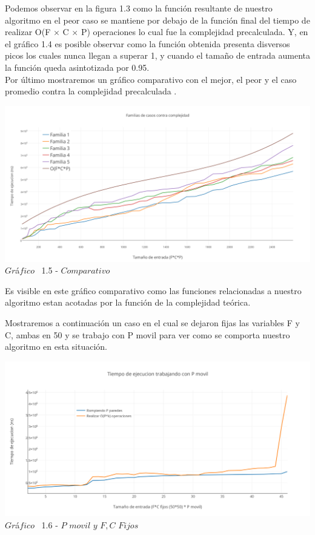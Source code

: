 Podemos observar en la figura 1.3 como la funci\'on resultante de nuestro algoritmo en el peor caso se mantiene por debajo de la funci\'on final del tiempo de realizar O(F $\times$ C $\times$ P) operaciones lo cual fue la complejidad precalculada. Y, en el gr\'afico 1.4 es posible observar como la funci\'on obtenida presenta disversos picos los cuales nunca llegan a superar 1, y cuando el tamaño de entrada aumenta la funci\'on queda asintotizada por 0.95.\\

Por \'ultimo mostraremos un gr\'afico comparativo con el mejor, el peor y el caso promedio contra la complejidad precalculada .\\

  
  \vspace*{0.3cm} \vspace*{0.3cm}
  \begin{center}
\includegraphics[scale=0.4]{./EJ1/comparativo1.png}
{$Gr$\'a$fico$ \ 1.5 - $Comparativo$}
  \end{center}
  \vspace*{0.3cm}
  
 Es visible en este gr\'afico comparativo como las funciones relacionadas a nuestro algoritmo estan acotadas por la funci\'on de la complejidad te\'orica.

Mostraremos a continuaci\'on un caso en el cual se dejaron fijas las variables F y C, ambas en 50 y se trabajo con P movil para ver como se comporta nuestro algoritmo en esta situaci\'on.

\vspace*{0.3cm} \vspace*{0.3cm}
  \begin{center}
\includegraphics[scale=0.65]{./EJ1/pMovil.png}
{$Gr$\'a$fico$ \ 1.6 - $P$ $movil$ $y$ $F,C$ $Fijos$}
  \end{center}
  \vspace*{0.3cm}

